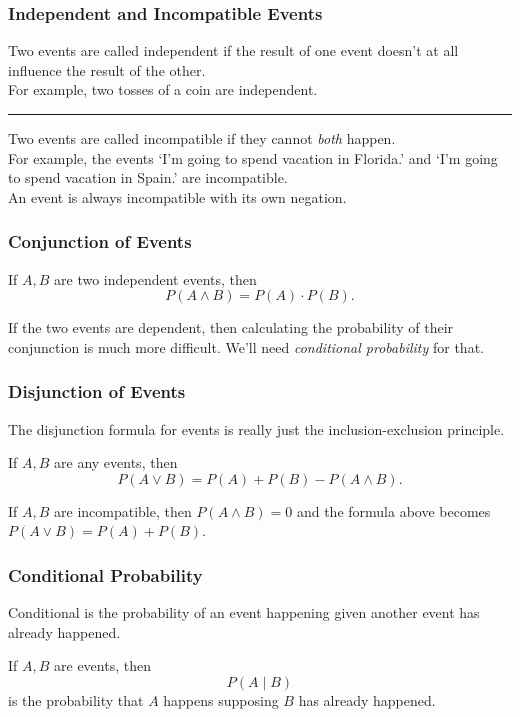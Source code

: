 \documentclass[aspectratio=169,11pt,usenames,dvipsnames]{beamer}
\begin{document}
\begin{frame}
 \frametitle{Independent and Incompatible Events}
 Two events are called \alert{independent} if the result of one event doesn't at
 all influence the result of the other.\pause\\
 For example, two tosses of a coin are independent.\pause\\
 \vspace{2\parskip}
 \hrule
 Two events are called \alert{incompatible} if they cannot \emph{both}
 happen.\pause\\
 For example, the events `I'm going to spend vacation in Florida.' and `I'm
 going to spend vacation in Spain.' are incompatible.\pause\\
 An event is always incompatible with its own negation.
\end{frame}

\begin{frame}
 \frametitle{Conjunction of Events}
 \begin{tcolorbox}[title=Conjunction Formula]
  If $A,B$ are two \alert{independent} events, then
  \[
   P(A \wedge B) = P(A) \cdot P(B).
  \]
 \end{tcolorbox}
 \pause
 If the two events are \alert{dependent}, then calculating the probability of
 their conjunction is much more difficult. We'll need \emph{conditional
 probability} for that.
\end{frame}

\begin{frame}
 \frametitle{Disjunction of Events}
 The disjunction formula for events is really just the inclusion-exclusion
 principle.\pause\\
 \begin{tcolorbox}[title=Disjunction Formula]
  If $A,B$ are any events, then
  \[
   P(A \vee B) = P(A) + P(B) - P(A \wedge B).
  \]
 \end{tcolorbox}
 \pause
 If $A,B$ are \alert{incompatible}, then $P(A \wedge B) = 0$ and the formula
 above becomes $P(A \vee B) = P(A) + P(B)$.
\end{frame}

\begin{frame}
 \frametitle{Conditional Probability}
 Conditional is the probability of an event happening \alert{given another event
 has already happened}.
 \pause
 \begin{tcolorbox}[title=Conditional Probability]
  If $A,B$ are events, then
  \[
   P(A \mid B)
  \]
  is the probability that $A$ happens supposing $B$ has already happened.
 \end{tcolorbox}
\end{frame}
\end{document}
